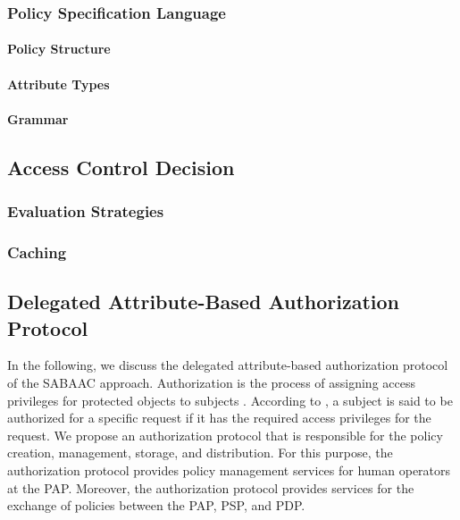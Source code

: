 \subsubsection{Policy Specification Language}
\paragraph{Policy Structure}
\paragraph{Attribute Types}
\paragraph{Grammar}

\subsection{Access Control Decision}

\subsubsection{Evaluation Strategies}

\subsubsection{Caching}

\subsection{Delegated Attribute-Based Authorization Protocol}
\label{sec:approach:sabaac:authorization}
In the following, we discuss the delegated attribute-based authorization protocol of the SABAAC approach.
Authorization is the process of assigning access privileges for protected objects to subjects \cite{Eckert2023}.
According to \citeauthor{Eckert2023} \cite{Eckert2023}, a subject is said to be authorized for a specific request if it has the required access privileges for the request.
We propose an authorization protocol that is responsible for the policy creation, management, storage, and distribution.
For this purpose, the authorization protocol provides policy management services for human operators at the PAP.
Moreover, the authorization protocol provides services for the exchange of policies between the PAP, PSP, and PDP.


